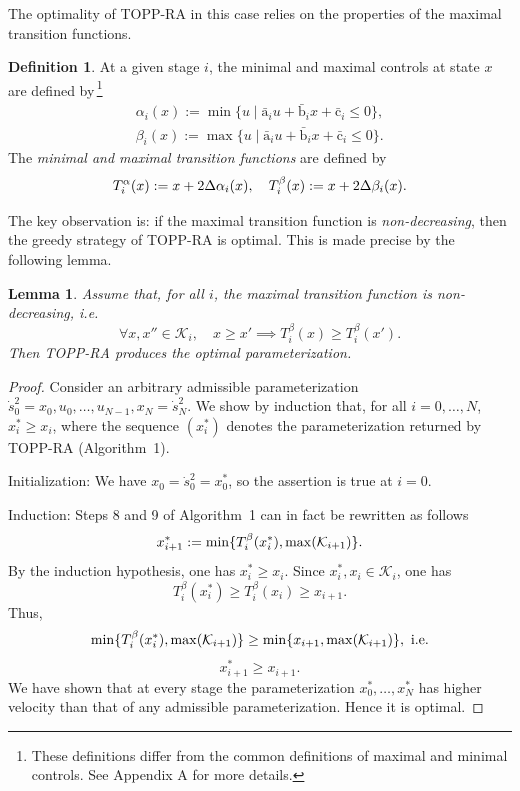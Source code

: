 \documentclass[journal]{IEEEtran}
\theoremstyle{plain}
\newtheorem{lem}{Lemma}
\theoremstyle{definition}
\newtheorem{definition2}{Definition}
\newenvironment{definition}
  {\renewcommand{\qedsymbol}{$\lozenge$}
   \pushQED{\qed}\begin{definition2}}
  {\popQED\end{definition2}}
\theoremstyle{definition}
\renewcommand{\vec}[1]{\bm{\mathrm{#1}}}  %
\newcommand{\calK}{\mathcal{K}}
\begin{document}
The optimality of TOPP-RA in this case relies on the properties of the
maximal transition functions.
\begin{definition}
  \label{def:alpha-beta}
  At a given stage $i$, the minimal and maximal controls at state $x$
  are defined by\,\footnote{These definitions differ from the
    common definitions of maximal and minimal controls\@. See Appendix A for more details.}
  \begin{equation*}
    \begin{aligned}
      \alpha_i(x) := \min\{u \mid \bar{\vec a}_i u + \bar {\vec b}_i x + \bar{\vec c}_i \leq 0 \}, \\
      \beta_i(x) := \max\{u \mid \bar{\vec a}_i u + \bar {\vec b}_i x + \bar{\vec c}_i \leq 0 \}.
    \end{aligned}
  \end{equation*}
  The \emph{minimal and maximal transition functions} are defined by
  \begin{equation*}
    T_i^\alpha(x) := x + 2 \Delta \alpha_i(x),\quad T_i^\beta(x) := x
    + 2 \Delta \beta_i(x). \qedhere
  \end{equation*}
\end{definition}

The key observation is: if the maximal transition function is
\emph{non-decreasing}, then the greedy strategy of TOPP-RA is optimal.
This is made precise by the following lemma.

\begin{lem}
\label{lem:main}
Assume that, for all $i$, the maximal transition function is
non-decreasing, i.e.
\[
  \forall x, x'' \in \mathcal{K}_i, \quad x \geq x' \implies
  T_i^\beta(x) \geq T^\beta_i(x').  
\]
Then TOPP-RA produces the optimal parameterization.
\end{lem}

\begin{proof}
  Consider an arbitrary admissible parameterization
  $\dot s_0^2 = x_0, u_0, \dots, u_{N-1}, x_N = \dot s_N^2$. We show
  by induction that, for all $i=0,\dots,N$, $x^*_{i} \geq x_i$, where
  the sequence $(x_{i}^*)$ denotes the parameterization returned by TOPP-RA
  (Algorithm~1). 

  \textrm{Initialization}: We have $x_0= \dot s_0^2 = x_0^*$, so the
  assertion is true at $i=0$.

  \textrm{Induction}: Steps 8 and 9 of Algorithm~1 can in fact be
  rewritten as follows
  \begin{equation*}
    x_{i+1}^* := \min \{ T_i^\beta(x_i^*), \max ({\cal K}_{i+1})\}.
  \end{equation*}
  By the induction hypothesis, one has $x_i^*\geq x_i$. Since
  $x_i^*, x_i\in \calK_i$, one has
  \[
  T_i^\beta (x_i^*) \geq T_i^\beta (x_i)  \geq x_{i+1}.
  \]
  Thus,
  \[
  \min \{ T_i^\beta(x_i^*), \max ({\cal K}_{i+1})\} \geq \min \{ x_{i+1},
  \max ({\cal K}_{i+1})\}, \ \textrm{i.e.}
  \]
  \[
  x_{i+1}^* \geq x_{i+1}.
  \]
  We have shown that at every stage the parameterization
  $x_0^*, \dots, x_N^*$ has higher velocity than that of any
  admissible parameterization. Hence it is optimal.
\end{proof}
\end{document}
